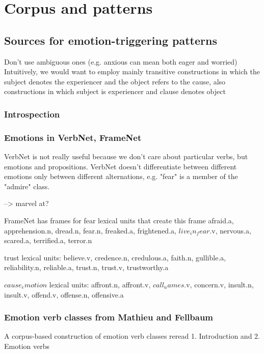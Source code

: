 
\chapter{Corpus and patterns} %

\label{ch:patterns} %


\section{Sources for emotion-triggering patterns}

Don't use ambiguous ones (e.g. anxious can mean both eager and worried)
Intuitively, we would want to employ mainly transitive constructions in which the subject denotes the experiencer and the object refers to the cause, also constructions in which subject is experiencer and clause denotes object


\subsection{Introspection}



\subsection{Emotions in VerbNet, FrameNet}
VerbNet is not really useful because we don't care about particular verbs, but emotions and propositions. VerbNet doesn't differentiate between different emotions only between different alternations, e.g. "fear" is a member of the "admire" class.

--> marvel at?

FrameNet has frames for
fear
lexical units that create this frame
afraid.a, apprehension.n, dread.n, fear.n, freaked.a, frightened.a, $live_in_fear$.v, nervous.a, scared.a, terrified.a, terror.n

trust
lexical units: believe.v, credence.n, credulous.a, faith.n, gullible.a, reliability.n, reliable.a, trust.n, trust.v, trustworthy.a

$cause_emotion$
lexical units: affront.n, affront.v, $call_names$.v, concern.v, insult.n, insult.v, offend.v, offense.n, offensive.a



\subsection{Emotion verb classes from Mathieu and Fellbaum}
A corpus-based construction of emotion verb classes
reread 1. Introduction and 2. Emotion verbs

